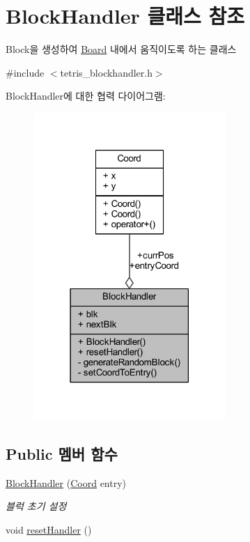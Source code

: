 \hypertarget{class_block_handler}{}\section{Block\+Handler 클래스 참조}
\label{class_block_handler}


Block을 생성하여 \mbox{\hyperlink{class_board}{Board}} 내에서 움직이도록 하는 클래스  




{\ttfamily \#include $<$tetris\+\_\+blockhandler.\+h$>$}



Block\+Handler에 대한 협력 다이어그램\+:
\nopagebreak
\begin{figure}[H]
\begin{center}
\leavevmode
\includegraphics[width=207pt]{class_block_handler__coll__graph}
\end{center}
\end{figure}
\subsection*{Public 멤버 함수}
\begin{DoxyCompactItemize}
\item 
\mbox{\hyperlink{class_block_handler_ae1955a1830df4398795c153ef54804fa}{Block\+Handler}} (\mbox{\hyperlink{struct_coord}{Coord}} entry)
\begin{DoxyCompactList}\small\item\em 블럭 초기 설정 \end{DoxyCompactList}\item 
void \mbox{\hyperlink{class_block_handler_a170a8b83b6df72530675d722a17fb8c4}{reset\+Handler}} ()
\end{DoxyCompactItemize}
